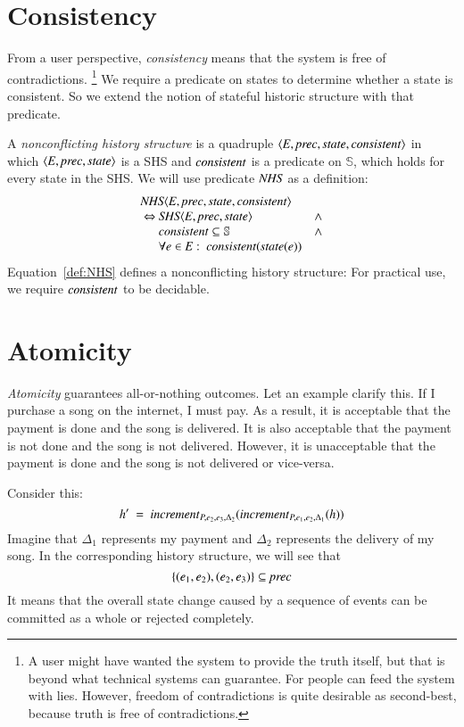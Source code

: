 \documentclass{elsarticle}
\def\id#1{\text{\em #1\/}}
\def\Events{{\mathit E}}
\begin{document}
\section{Consistency}
\label{sct:Consistency}
	From a user perspective, {\em consistency} means that the system is free of contradictions.%
\footnote{A user might have wanted the system to provide the truth itself,
	but that is beyond what technical systems can guarantee. For people can feed the system with lies.
	However, freedom of contradictions is quite desirable as second-best, because truth is free of contradictions.}
	We require a predicate on states to determine whether a state is consistent.
	So we extend the notion of stateful historic structure with that predicate.

	A {\em nonconflicting history structure} is a quadruple $\la\Events, \id{prec}, \id{state}, \id{consistent}\ra$ in which
	$\la \Events, \id{prec}, \id{state}\ra$ is a SHS and $\id{consistent}$ is a predicate on $\mathbb S$,
	which holds for every state in the SHS.
	We will use predicate $\id{NHS}$ as a definition:
\begin{equation}
\begin{array}{l@{}ll}
	\multicolumn{3}{l}{\id{NHS}\la \Events, \id{prec}, \id{state}, \id{consistent}\ra}\\
	\ \Leftrightarrow\ &\id{SHS}\la \Events, \id{prec}, \id{state}\ra&\wedge\\
	&\id{consistent}\subseteq\mathbb S&\wedge\\
	&\forall e\in\Events:\ \id{consistent}(\id{state}(e))&
\end{array}
\label{def:NHS}
\end{equation}
	Equation~\ref{def:NHS} defines a nonconflicting history structure:
	For practical use, we require $\id{consistent}$ to be decidable.

\section{Atomicity}
\label{sct:Atomicity}
	{\em Atomicity} guarantees all-or-nothing outcomes.
	Let an example clarify this.
	If I purchase a song on the internet, I must pay.
	As a result, it is acceptable that the payment is done and the song is delivered.
	It is also acceptable that the payment is not done and the song is not delivered.
	However, it is unacceptable that the payment is done and the song is not delivered or vice-versa.

	Consider this:
	\[h'\ =\ \id{increment}_{P,e_2,e_3,\Delta_2}(\id{increment}_{P,e_1,e_2,\Delta_1}(h))\]
	Imagine that $\Delta_1$ represents my payment and $\Delta_2$ represents the delivery of my song.
	In the corresponding history structure, we will see that
	\[\{(e_1,e_2), (e_2,e_3)\}\subseteq\id{prec} \]
	It means that the overall state change caused by a sequence of events can be committed as a whole or rejected completely.
\end{document}

